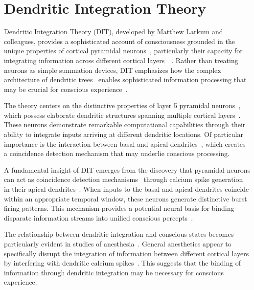 \section{Dendritic Integration Theory}

 Dendritic Integration Theory (DIT), developed by Matthew Larkum and colleagues, provides a sophisticated account of consciousness grounded in the unique properties of cortical pyramidal neurons~, particularly their capacity for integrating information across different cortical layers~~\cite{Larkum2009, Larkum2013}. Rather than treating neurons as simple summation devices, DIT emphasizes how the complex architecture of dendritic trees~ enables sophisticated information processing that may be crucial for conscious experience~.

The theory centers on the distinctive properties of layer 5 pyramidal neurons~, which possess elaborate dendritic structures spanning multiple cortical layers~\cite{Major2013, Larkum2022}. These neurons demonstrate remarkable computational capabilities through their ability to integrate inputs arriving at different dendritic locations. Of particular importance is the interaction between basal and apical dendrites~, which creates a coincidence detection mechanism that may underlie conscious processing.

A fundamental insight of DIT emerges from the discovery that pyramidal neurons can act as coincidence detection mechanisms~ through calcium spike generation in their apical dendrites~\cite{Larkum2013, Larkum2022b}. When inputs to the basal and apical dendrites coincide within an appropriate temporal window, these neurons generate distinctive burst firing patterns. This mechanism provides a potential neural basis for binding disparate information streams into unified conscious percepts~.

The relationship between dendritic integration and conscious states becomes particularly evident in studies of anesthesia~. General anesthetics appear to specifically disrupt the integration of information between different cortical layers by interfering with dendritic calcium spikes~\cite{Suzuki2020, Phillips2018}. This suggests that the binding of information through dendritic integration may be necessary for conscious experience.

